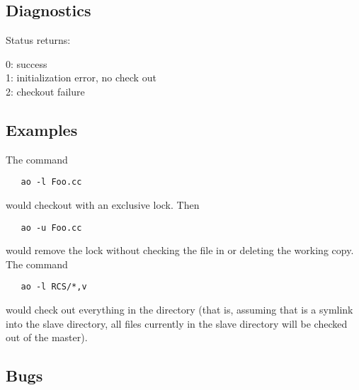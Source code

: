 \subsection*{Diagnostics}

Status returns:
\begin{status}
   0: success\\
   1: initialization error, no check out\\
   2: checkout failure
\end{status}

\subsection*{Examples}

The command

\begin{verbatim}
   ao -l Foo.cc
\end{verbatim}

\noindent
would checkout  with an exclusive lock.  Then

\begin{verbatim}
   ao -u Foo.cc
\end{verbatim}

\noindent
would remove the lock without checking the file in or deleting the working
copy.  The command

\begin{verbatim}
   ao -l RCS/*,v
\end{verbatim}

\noindent
would check out everything in the directory (that is, assuming that 
is a symlink into the slave directory, all files currently in the slave
directory will be checked out of the master).

\subsection*{Bugs}

